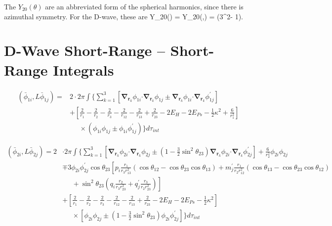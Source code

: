 \documentclass[Dissertation.tex]{subfiles}
\begin{document}
\noindent The $Y_{20}(\theta)$ are an abbreviated form of the spherical harmonics, since there is azimuthal symmetry.  For the D-wave, these are
\beq
\label{eq:DWaveSpherHarm}
Y_{20}(\theta) = Y_{20}(\theta,\varphi) =  (3\cos^2\theta - 1).
\eeq



\section{D-Wave Short-Range -- Short-Range Integrals}
\label{sec:DWaveShortShort}

\begin{align}
\label{eq:DWavePhi1Phi1}
\left(\bar{\phi}_{1i},L \bar{\phi}_{1j}\right) = &2 \cdot 2\pi \int{ \Bigg\{ \sum_{k=1}^3 \left[ \boldsymbol{\nabla}_{\!\mathbf{r}_k} \nonumber \phi_{1i} \boldsymbol{\cdot} \boldsymbol{\nabla}_{\!\mathbf{r}_k} \phi_{1j} \pm \boldsymbol{\nabla}_{\!\mathbf{r}_k} \phi_{1i} \boldsymbol{\cdot} \boldsymbol{\nabla}_{\!\mathbf{r}_k} \phi_{1j}^\prime \right] } \\
\nonumber  &+ \left. \left[\frac{2}{r_1} - \frac{2}{r_2} - \frac{2}{r_3} - \frac{2}{r_{12}} - \frac{2}{r_{13}} + \frac{2}{r_{23}} - 2 E_H - 2 E_{Ps} - \frac{1}{2}\kappa^2 + \frac{6}{r_1^2} \right] \right. \\
 &\;\;\;\;\; \times \left(\phi_{1i} \phi_{1j} \pm \phi_{1i} \phi_{1j}^\prime \right) \Bigg\} d\tau_{int}
\end{align}

\begin{align}
\label{eq:DWavePhi2Phi2}
\left(\bar{\phi}_{2i},L \bar{\phi}_{2j}\right) = 2 & \cdot 2\pi \int \Bigg\{ \sum_{k=1}^3 \left[ \boldsymbol{\nabla}_{\!\mathbf{r}_k} \nonumber \phi_{2i} \boldsymbol{\cdot} \boldsymbol{\nabla}_{\!\mathbf{r}_k} \phi_{2j} \pm \left(1-\tfrac{3}{2}\sin^2\theta_{23}\right) \boldsymbol{\nabla}_{\!\mathbf{r}_k} \phi_{2i} \boldsymbol{\cdot} \boldsymbol{\nabla}_{\!\mathbf{r}_k} \phi_{2j}^\prime \right]  + \frac{6}{r_2^2}\phi_{2i}\phi_{2j} \\
 \nonumber &\mp 3 \phi_{2i} \phi_{2j}^\prime \cos\theta_{23} \left[p_i \frac{r_1}{r_3 r_{13}^2} (\cos\theta_{12} - \cos\theta_{23} \cos\theta_{13}) + m_j^\prime \frac{r_1}{r_2 r_{12}^2}(\cos\theta_{13} - \cos\theta_{23} \cos\theta_{12})\right.\\
 \nonumber & \left. \;\;\;\;\;  + \sin^2\theta_{23} \left(q_i \frac{r_2}{r_3 r_{23}^2} + q_j^\prime \frac{r_3}{r_2 r_{23}^2} \right) \right] \\
 \nonumber &+ \left. \left[\frac{2}{r_1} - \frac{2}{r_2} - \frac{2}{r_3} - \frac{2}{r_{12}} - \frac{2}{r_{13}} + \frac{2}{r_{23}} - 2 E_H - 2 E_{Ps} - \frac{1}{2}\kappa^2 \right] \right. \\
 &\;\;\;\;\; \times \left[\phi_{2i} \phi_{2j} \pm \left(1-\tfrac{3}{2}\sin^2\theta_{23}\right) \phi_{2i} \phi_{2j}^\prime \right] \Bigg\} d\tau_{int}
\end{align}
\end{document}
